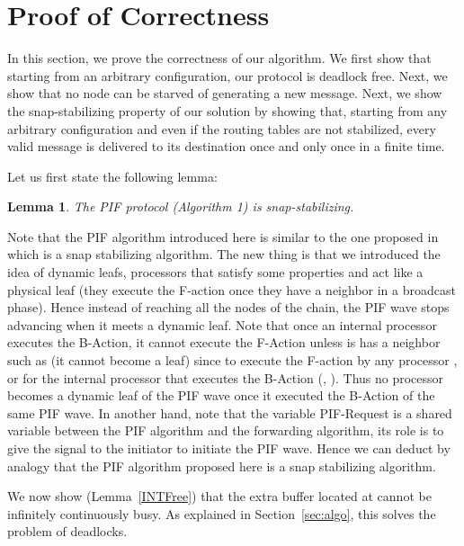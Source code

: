 \documentclass{llncs}
\renewenvironment{proof}{{\it Proof. } }{{\hfill }\vspace{.5pc}}
\newtheorem{lem}{Lemma}
\begin{document}
  







\section{Proof of Correctness\label{sec:proof}}

In this section, we prove the correctness of our algorithm.
We first show that starting from an arbitrary configuration, our protocol is deadlock free.  Next, we show that no node
can be starved of generating a new message. Next, we show the snap-stabilizing property of our solution by showing that,
starting from any arbitrary configuration and even if the routing tables are not stabilized, every valid message is 
delivered to its destination once and only once in a finite time.  

Let us first state the following lemma:

\begin{lem}\label{PIF}
The PIF protocol (Algorithm 1) is snap-stabilizing.
\end{lem}  



\begin{proof}
Note that the PIF algorithm introduced here is similar to the one proposed in \cite{Bui07} which is a snap stabilizing algorithm. The new thing is that we introduced the idea of dynamic leafs, processors that satisfy some properties and act like a physical leaf (they execute the F-action once they have a neighbor in a broadcast phase). Hence instead of reaching all the nodes of the chain, the PIF wave stops advancing when it meets a dynamic leaf. Note that once an internal processor  executes the B-Action, it cannot execute the F-Action unless is has a neighbor  such as  (it cannot become a leaf) since to execute the F-action by any processor ,  or for the internal processor that executes the B-Action  (, ). Thus no processor becomes a dynamic leaf of the PIF wave once it executed the B-Action of the same PIF wave.
In another hand, note that the variable PIF-Request is a shared variable between the PIF algorithm and the forwarding algorithm, its role is to give the signal to the initiator to initiate the PIF wave. Hence we can deduct by analogy that the PIF algorithm proposed here is a snap stabilizing algorithm.
\end{proof}



We now show (Lemma~\ref{INTFree}) that the extra buffer located at  cannot be infinitely continuously busy.  As explained in
Section~\ref{sec:algo}, this solves the problem of deadlocks. 
\end{document}
